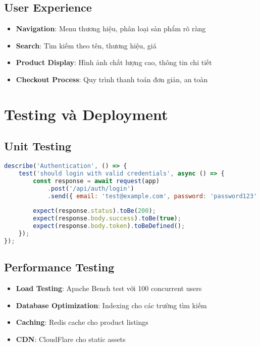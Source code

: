 \subsection{User Experience}
\begin{itemize}
    \item \textbf{Navigation}: Menu thương hiệu, phân loại sản phẩm rõ ràng
    \item \textbf{Search}: Tìm kiếm theo tên, thương hiệu, giá
    \item \textbf{Product Display}: Hình ảnh chất lượng cao, thông tin chi tiết
    \item \textbf{Checkout Process}: Quy trình thanh toán đơn giản, an toàn
\end{itemize}

\section{Testing và Deployment}

\subsection{Unit Testing}
\begin{lstlisting}[language=JavaScript, title={Test Authentication}]
describe('Authentication', () => {
    test('should login with valid credentials', async () => {
        const response = await request(app)
            .post('/api/auth/login')
            .send({ email: 'test@example.com', password: 'password123' });
        
        expect(response.status).toBe(200);
        expect(response.body.success).toBe(true);
        expect(response.body.token).toBeDefined();
    });
});
\end{lstlisting}

\subsection{Performance Testing}
\begin{itemize}
    \item \textbf{Load Testing}: Apache Bench test với 100 concurrent users
    \item \textbf{Database Optimization}: Indexing cho các trường tìm kiếm
    \item \textbf{Caching}: Redis cache cho product listings
    \item \textbf{CDN}: CloudFlare cho static assets
\end{itemize}

